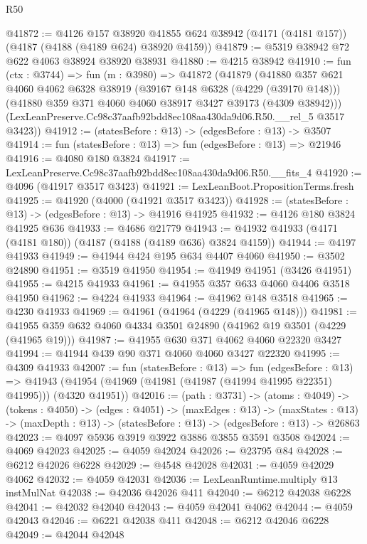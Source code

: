 \begin{lexlean}{R50}
\begin{coremodule}
@41872 := @4126
    @157
    @38920
    @41855
    @624
    @38942
    (@4171 (@4181 @157))
    (@4187 (@4188 (@4189 @624) @38920 @4159))
@41879 := @5319 @38942 @72 @622 @4063 @38924 @38920 @38931
@41880 := @4215 @38942
@41910 := fun (ctx : @3744) =>
  fun (m : @3980) =>
  @41872
    (@41879
      (@41880
        @357
        @621
        @4060
        @4062
        @6328
        @38919
        (@39167 @148 @6328 (@4229 (@39170 @148)))
        (@41880 @359 @371 @4060 @4060 @38917 @3427 @39173 (@4309 @38942)))
      (LexLeanPreserve.Cc98c37aafb92bdd8ec108aa430da9d06.R50.__rel_5 @3517 @3423))
@41912 := (statesBefore : @13) -> (edgesBefore : @13) -> @3507
@41914 := fun (statesBefore : @13) => fun (edgesBefore : @13) => @21946
@41916 := @4080 @180 @3824
@41917 := LexLeanPreserve.Cc98c37aafb92bdd8ec108aa430da9d06.R50.__fits_4
@41920 := @4096 (@41917 @3517 @3423)
@41921 := LexLeanBoot.PropositionTerms.fresh
@41925 := @41920 (@4000 (@41921 @3517 @3423))
@41928 := (statesBefore : @13) -> (edgesBefore : @13) -> @41916 @41925
@41932 := @4126 @180 @3824 @41925 @636
@41933 := @4686 @21779
@41943 := @41932 @41933 (@4171 (@4181 @180)) (@4187 (@4188 (@4189 @636) @3824 @4159))
@41944 := @4197 @41933
@41949 := @41944 @424 @195 @634 @4407 @4060
@41950 := @3502 @24890
@41951 := @3519 @41950
@41954 := @41949 @41951 (@3426 @41951)
@41955 := @4215 @41933
@41961 := @41955 @357 @633 @4060 @4406 @3518 @41950
@41962 := @4224 @41933
@41964 := @41962 @148 @3518
@41965 := @4230 @41933
@41969 := @41961 (@41964 (@4229 (@41965 @148)))
@41981 := @41955 @359 @632 @4060 @4334 @3501 @24890 (@41962 @19 @3501 (@4229 (@41965 @19)))
@41987 := @41955 @630 @371 @4062 @4060 @22320 @3427
@41994 := @41944 @439 @90 @371 @4060 @4060 @3427 @22320
@41995 := @4309 @41933
@42007 := fun (statesBefore : @13) =>
  fun (edgesBefore : @13) =>
  @41943 (@41954 (@41969 (@41981 (@41987 (@41994 @41995 @22351) @41995))) (@4320 @41951))
@42016 := (path : @3731) ->
  (atoms : @4049) ->
  (tokens : @4050) ->
  (edges : @4051) ->
  (maxEdges : @13) ->
  (maxStates : @13) -> (maxDepth : @13) -> (statesBefore : @13) -> (edgesBefore : @13) -> @26863
@42023 := @4097 @5936 @3919 @3922 @3886 @3855 @3591 @3508
@42024 := @4069 @42023
@42025 := @4059 @42024
@42026 := @23795 @84
@42028 := @6212 @42026 @6228
@42029 := @4548 @42028
@42031 := @4059 @42029 @4062
@42032 := @4059 @42031
@42036 := LexLeanRuntime.multiply @13 instMulNat
@42038 := @42036 @42026 @411
@42040 := @6212 @42038 @6228
@42041 := @42032 @42040
@42043 := @4059 @42041 @4062
@42044 := @4059 @42043
@42046 := @6221 @42038 @411
@42048 := @6212 @42046 @6228
@42049 := @42044 @42048

\end{coremodule}
\end{lexlean}
